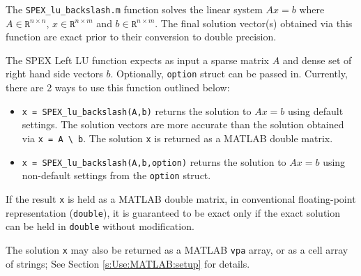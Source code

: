 \documentclass[12pt]{report}
\theoremstyle{definition}
\begin{document}
The \verb|SPEX_lu_backslash.m| function solves the linear system $A x = b$ where
$A \in \mathtt{R}^{n \times n}$, $x \in \mathtt{R}^{n \times m}$ and $b \in
\mathtt{R}^{n \times m}$. The final solution vector(s) obtained via this
function are exact prior to their conversion to double precision.

The SPEX Left LU function expects as input a sparse matrix $A$ and dense set of
right hand side vectors $b$. Optionally, \verb|option| struct can be passed in.
Currently, there are 2 ways to use this function outlined below:

\begin{itemize}

\item \verb|x = SPEX_lu_backslash(A,b)| returns the solution to $A x =
b$ using default settings. The solution vectors are more accurate than
the solution obtained via \verb|x = A \ b|.  The solution \verb|x| is
returned as a MATLAB double matrix.

\item \verb|x = SPEX_lu_backslash(A,b,option)| returns the solution to $A x =
b$ using non-default settings from the \verb|option| struct.

\end{itemize}

If the result \verb|x| is held as a MATLAB double matrix, in conventional
floating-point representation (\verb|double|), it is guaranteed to be exact
only if the exact solution can be held in \verb|double| without modification.

The solution \verb|x| may also be returned as a MATLAB \verb|vpa| array, or as
a cell array of strings; See Section \ref{s:Use:MATLAB:setup} for details.




\end{document}
